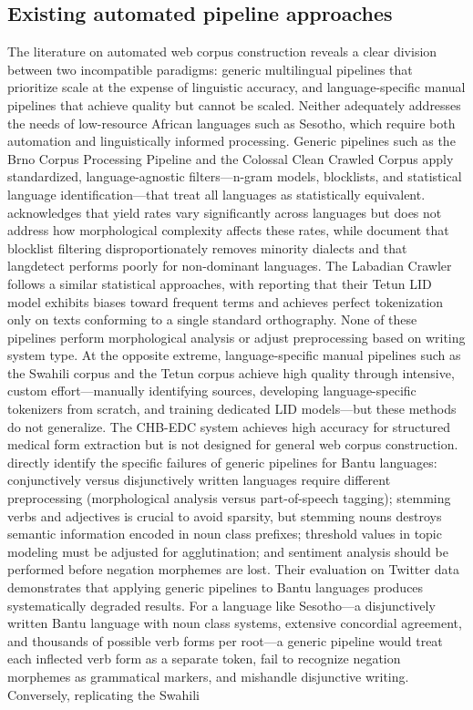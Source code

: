 \documentclass[11pt,a4paper]{article}
\begin{document}
\subsection{Existing automated pipeline approaches}
The literature on automated web corpus construction reveals a clear division between two incompatible paradigms: generic multilingual pipelines that prioritize scale at the expense of linguistic accuracy, and language-specific manual pipelines that achieve quality but cannot be scaled. Neither adequately addresses the needs of low-resource African languages such as Sesotho, which require both automation and linguistically informed processing. Generic pipelines such as the Brno Corpus Processing Pipeline \citet{suchomel2020better} and the Colossal Clean Crawled Corpus \citep{dodge2021documenting} apply standardized, language-agnostic filters—n-gram models, blocklists, and statistical language identification—that treat all languages as statistically equivalent. \citet{suchomel2020better} acknowledges that yield rates vary significantly across languages but does not address how morphological complexity affects these rates, while \citet{dodge2021documenting} document that blocklist filtering disproportionately removes minority dialects and that langdetect performs poorly for non-dominant languages. The Labadian Crawler \citet{de2024data} follows a similar statistical approaches, with \citet{de2024data} reporting that their Tetun LID model exhibits biases toward frequent terms and achieves perfect tokenization only on texts conforming to a single standard orthography. None of these pipelines perform morphological analysis or adjust preprocessing based on writing system type. At the opposite extreme, language-specific manual pipelines such as the Swahili corpus \citet{masua2024heart} and the Tetun corpus \citet{de2024data} achieve high quality through intensive, custom effort—manually identifying sources, developing language-specific tokenizers from scratch, and training dedicated LID models—but these methods do not generalize. The CHB-EDC system \citet{Zhou2024} achieves high accuracy for structured medical form extraction but is not designed for general web corpus construction. \citet{nchabeleng2020evaluating} directly identify the specific failures of generic pipelines for Bantu languages: conjunctively versus disjunctively written languages require different preprocessing (morphological analysis versus part-of-speech tagging); stemming verbs and adjectives is crucial to avoid sparsity, but stemming nouns destroys semantic information encoded in noun class prefixes; threshold values in topic modeling must be adjusted for agglutination; and sentiment analysis should be performed before negation morphemes are lost. Their evaluation on Twitter data demonstrates that applying generic pipelines to Bantu languages produces systematically degraded results. For a language like Sesotho—a disjunctively written Bantu language with noun class systems, extensive concordial agreement, and thousands of possible verb forms per root—a generic pipeline would treat each inflected verb form as a separate token, fail to recognize negation morphemes as grammatical markers, and mishandle disjunctive writing. Conversely, replicating the Swahili 
\end{document}
